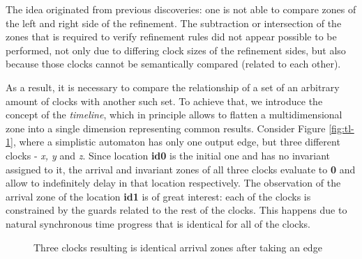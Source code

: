 The idea originated from previous discoveries: one is not able to compare zones of the left and right side of the refinement. The subtraction or intersection of the zones that is required to verify refinement rules did not appear possible to be performed, not only due to differing clock sizes of the refinement sides, but also because those clocks cannot be semantically compared (related to each other). 

As a result, it is necessary to compare the relationship of a set of an arbitrary amount of clocks with another such set. To achieve that, we introduce the concept of the \textit{timeline}, which in principle allows to flatten a multidimensional zone into a single dimension representing common results. Consider Figure \ref{fig:tl-1}, where a simplistic automaton has only one output edge, but three different clocks - \textit{x, y} and \textit{z}. Since location \textbf{id0} is the initial one and has no invariant assigned to it, the arrival and invariant zones of all three clocks evaluate to \textbf{0} and allow to indefinitely delay in that location respectively. The observation of the arrival zone of the location \textbf{id1} is of great interest: each of the clocks is constrained by the guards related to the rest of the clocks. This happens due to natural synchronous time progress that is identical for all of the clocks.

\begin{figure}
\centering
{}
\caption{Three clocks resulting is identical arrival zones after taking an edge} \label{fig:tl-aut}
\end{figure}

